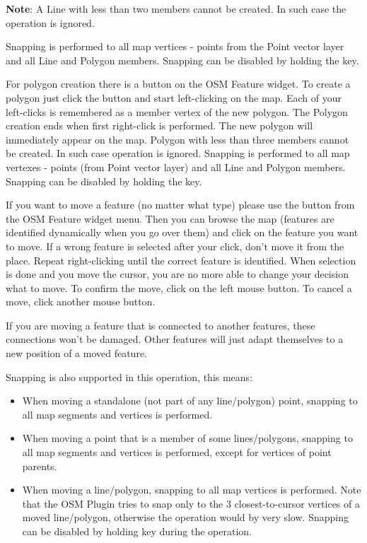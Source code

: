 \textbf{Note}: A Line with less than two members cannot be created. In
such case the operation is ignored.

Snapping is performed to all map vertices - points from the Point vector layer
and all Line and Polygon members. Snapping can be disabled by holding the
 key.


For polygon creation there is a 
button on the OSM Feature widget. To create a polygon just click the button
and start left-clicking on the map. Each of your left-clicks is remembered as
a member vertex of the new polygon. The Polygon creation ends when first
right-click is performed. The new polygon will immediately appear on the map.
Polygon with less than three members cannot be created. In such case
operation is ignored. Snapping is performed to all map vertexes - points
(from Point vector layer) and all Line and Polygon members. Snapping can be
disabled by holding the  key.


If you want to move a feature (no matter what type) please use the
 button from the OSM Feature widget menu.
Then you can browse the map (features are identified dynamically when you
go over them) and click on the feature you want to move. If a wrong feature is
selected after your click, don't move it from the place. Repeat right-clicking
until the correct feature is identified. When selection is done and you move
the cursor, you are no more able to change your decision what to move.
To confirm the move, click on the left mouse button. To cancel a move, click
another mouse button.

If you are moving a feature that is connected to another features, these
connections won't be damaged. Other features will just adapt themselves to
a new position of a moved feature.

Snapping is also supported in this operation, this means:

\begin{itemize}[label=--]
\item When moving a standalone (not part of any line/polygon) point,
snapping to all map segments and vertices is performed.
\item When moving a point that is a member of some lines/polygons,
snapping to all map segments and vertices is performed, except for
vertices of point parents.
\item When moving a line/polygon, snapping to all map vertices is performed.
Note that the OSM Plugin tries to snap only to the 3 closest-to-cursor
vertices of a moved line/polygon, otherwise the operation would by very slow.
Snapping can be disabled by holding  key during the operation.
\end{itemize}

